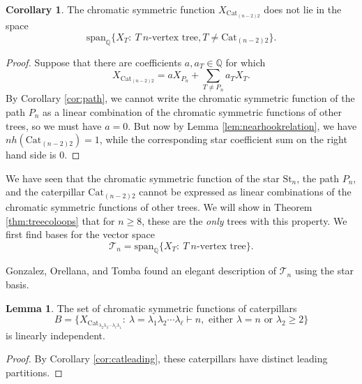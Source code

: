 \documentclass[12pt]{amsart}  %
\theoremstyle{definition}
\newtheorem{lemma}[theorem]{Lemma}
\newtheorem{corollary}[theorem]{Corollary}
\theoremstyle{remark}
\numberwithin{equation}{section}
\begin{document}
\begin{corollary}\label{cor:cat}
The chromatic symmetric function $X_{\text{Cat}_{(n-2)2}}$ does not lie in the space
\begin{equation}
\text{span}_{\mathbb Q}\{X_T: \ T \ n\text{-vertex tree}, T\neq \text{Cat}_{(n-2)2}\}.
\end{equation}
\end{corollary}

\begin{proof}
Suppose that there are coefficients $a,a_T\in\mathbb Q$ for which
\begin{equation}
X_{\text{Cat}_{(n-2)2}}=aX_{P_n}+\sum_{T\neq P_n}a_TX_T.
\end{equation}
By Corollary \ref{cor:path}, we cannot write the chromatic symmetric function of the path $P_n$ as a linear combination of the chromatic symmetric functions of other trees, so we must have $a=0$. But now by Lemma \ref{lem:nearhookrelation}, we have $nh(\text{Cat}_{(n-2)2})=1$, while the corresponding star coefficient sum on the right hand side is $0$.
\end{proof}

We have seen that the chromatic symmetric function of the star $\text{St}_n$, the path $P_n$, and the caterpillar $\text{Cat}_{(n-2)2}$ cannot be expressed as linear combinations of the chromatic symmetric functions of other trees. We will show in Theorem \ref{thm:treecoloops} that for $n\geq 8$, these are the \emph{only} trees with this property. We first find bases for the vector space
\begin{equation}
\mathcal T_n=\text{span}_{\mathbb Q}\{X_T: \ T \ n\text{-vertex tree}\}.
\end{equation}

Gonzalez, Orellana, and Tomba found an elegant description of $\mathcal T_n$ using the star basis.

\begin{lemma}\label{lem:catbasis}
\cite[Proposition 6.9]{chromstar} The set of chromatic symmetric functions of caterpillars
\begin{equation}\label{eq:catbasis}
B=\{X_{\text{Cat}_{\lambda_2\lambda_3\cdots\lambda_\ell\lambda_1}}: \ \lambda=\lambda_1\lambda_2\cdots\lambda_\ell\vdash n, \text{ either }\lambda=n\text{ or } \lambda_2\geq 2\}
\end{equation}
is linearly independent.
\end{lemma}

\begin{proof}
By Corollary \ref{cor:catleading}, these caterpillars have distinct leading partitions.
\end{proof}
\end{document}
